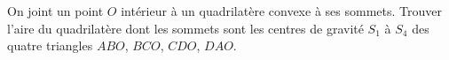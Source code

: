 On joint un point $O$ intérieur à un quadrilatère convexe à ses sommets. Trouver l'aire du quadrilatère dont les sommets sont les centres de gravité $S_1$ à $S_4$ des quatre triangles $ABO$, $BCO$, $CDO$, $DAO$.
